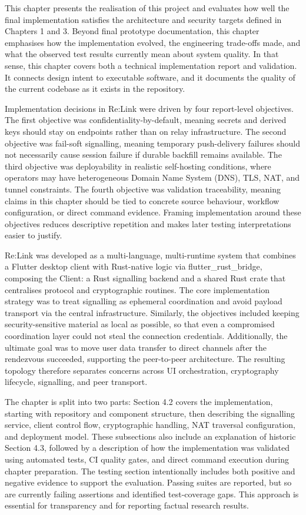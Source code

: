 \documentclass[12pt,a4paper]{article}
\begin{document}
This chapter presents the realisation of this project and evaluates how well the final implementation satisfies the architecture and security targets defined in Chapters 1 and 3. Beyond final prototype documentation, this chapter emphasises how the implementation evolved, the engineering trade-offs made, and what the observed test results currently mean about system quality. In that sense, this chapter covers both a technical implementation report and validation. It connects design intent to executable software, and it documents the quality of the current codebase as it exists in the repository.

Implementation decisions in Re:Link were driven by four report-level objectives. The first objective was confidentiality-by-default, meaning secrets and derived keys should stay on endpoints rather than on relay infrastructure. The second objective was fail-soft signalling, meaning temporary push-delivery failures should not necessarily cause session failure if durable backfill remains available. The third objective was deployability in realistic self-hosting conditions, where operators may have heterogeneous Domain Name System (DNS), TLS, NAT, and tunnel constraints. The fourth objective was validation traceability, meaning claims in this chapter should be tied to concrete source behaviour, workflow configuration, or direct command evidence. Framing implementation around these objectives reduces descriptive repetition and makes later testing interpretations easier to justify.

Re:Link was developed as a multi-language, multi-runtime system that combines a Flutter desktop client with Rust-native logic via flutter\_rust\_bridge, composing the Client: a Rust signalling backend and a shared Rust crate that centralises protocol and cryptographic routines. The core implementation strategy was to treat signalling as ephemeral coordination and avoid payload transport via the central infrastructure. Similarly, the objectives included keeping security-sensitive material as local as possible, so that even a compromised coordination layer could not steal the connection credentials. Additionally, the ultimate goal was to move user data transfer to direct channels after the rendezvous succeeded, supporting the peer-to-peer architecture. The resulting topology therefore separates concerns across UI orchestration, cryptography lifecycle, signalling, and peer transport.

The chapter is split into two parts: Section 4.2 covers the implementation, starting with repository and component structure, then describing the signalling service, client control flow, cryptographic handling, NAT traversal configuration, and deployment model. These subsections also include an explanation of historic Section 4.3, followed by a description of how the implementation was validated using automated tests, CI quality gates, and direct command execution during chapter preparation. The testing section intentionally includes both positive and negative evidence to support the evaluation. Passing suites are reported, but so are currently failing assertions and identified test-coverage gaps. This approach is essential for transparency and for reporting factual research results.
\end{document}
